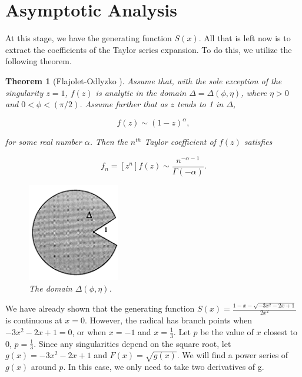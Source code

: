 \documentclass[11pt]{amsart}
\theoremstyle{plain}%
\newtheorem{thm}{Theorem}[section]
\newtheorem{prop}[thm]{Proposition}
\theoremstyle{definition}
\theoremstyle{remark}
\numberwithin{equation}{thm}
\begin{document}
\section{Asymptotic Analysis}

At this stage, we have the generating function $S(x)$. All that is left now is to extract the coefficients of the Taylor series expansion. To do this, we utilize the following theorem.

%

\begin{thm}[Flajolet-Odlyzko \cite{Flajolet}]
\label{F-O}
Assume that, with the sole exception of the singularity $z = 1$, $f(z)$ is analytic in the domain $\Delta = \Delta(\phi, \eta)$, where $\eta > 0$ and $0 < \phi < (\pi/2)$. Assume further that as $z$ tends to 1 in $\Delta$,

$$ f(z) \sim (1-z)^\alpha,$$

for some real number $\alpha$. Then the $n^{th}$ Taylor coefficient of $f(z)$ satisfies

$$ f_n = [z^n]f(z) \sim \frac{n^{-\alpha-1}}{\Gamma(-\alpha)}.$$

\begin{figure}[htp]
    \centering
    \includegraphics[width=4cm]{FlajoletDomain.png}
    \caption{The domain $\Delta(\phi, \eta)$. \cite{Flajolet}}
    \label{fig:flajoletdomain}
\end{figure}
\end{thm}

We have already shown that the generating function $S(x) = \frac{1-x - \sqrt{-3x^2 - 2x + 1}}{2x^2}$ is continuous at $x = 0$. However, the radical has branch points when $-3x^2 - 2x + 1 = 0$, or when $x = -1$ and $x = \frac{1}{3}$. Let $p$ be the value of $x$ closest to $0$, $p=\frac{1}{3}$. Since any singularities depend on the square root, let $g(x) = -3x^2 - 2x + 1$ and $F(x) = \sqrt{g(x)}$. We will find a power series of $g(x)$ around $p$. In this case, we only need to take two derivatives of g.
\end{document}
